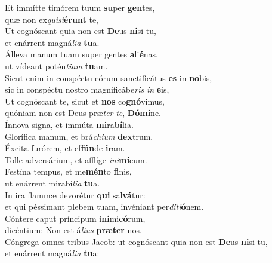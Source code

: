 \evenverse Et immítte timórem tuum \textbf{su}per \textbf{gen}tes,~\*\\
\evenverse quæ non ex\textit{qui}\textit{si}\textbf{é}\textbf{runt} te,\\
\oddverse Ut cognóscant quia non est \textbf{De}us \textbf{ni}si tu,~\*\\
\oddverse et enárrent magná\textit{li}\textit{a} \textbf{tu}a.\\
\evenverse Álleva manum tuam super gentes \textbf{a}li\textbf{é}nas,~\*\\
\evenverse ut vídeant potén\textit{ti}\textit{am} \textbf{tu}am.\\
\oddverse Sicut enim in conspéctu eórum sanctificátus \textbf{es} in \textbf{no}bis,~\*\\
\oddverse sic in conspéctu nostro magnificábe\textit{ris} \textit{in} \textbf{e}is,\\
\evenverse Ut cognóscant te, sicut et \textbf{nos} co\textbf{gnó}vimus,~\*\\
\evenverse quóniam non est Deus præ\textit{ter} \textit{te}, \textbf{Dó}\textbf{mi}ne.\\
\oddverse Ínnova signa, et immúta \textbf{mi}ra\textbf{bí}lia.~\*\\
\oddverse Glorífica manum, et brá\textit{chi}\textit{um} \textbf{dex}trum.\\
\evenverse Éxcita furórem, et ef\textbf{fún}de \textbf{i}ram.~\*\\
\evenverse Tolle adversárium, et afflíge \textit{i}\textit{ni}\textbf{mí}cum.\\
\oddverse Festína tempus, et me\textbf{mén}to \textbf{fi}nis,~\*\\
\oddverse ut enárrent mirabí\textit{li}\textit{a} \textbf{tu}a.\\
\evenverse In ira flammæ devorétur \textbf{qui} sal\textbf{vá}tur:~\*\\
\evenverse et qui péssimant plebem tuam, invéniant per\textit{di}\textit{ti}\textbf{ó}nem.\\
\oddverse Cóntere caput príncipum i\textbf{ni}mi\textbf{có}rum,~\*\\
\oddverse dicéntium: Non est á\textit{li}\textit{us} \textbf{præ}\textbf{ter} nos.\\
\evenverse Cóngrega omnes tribus Jacob: ut cognóscant quia non est \textbf{De}us \textbf{ni}si tu,~\*\\
\evenverse et enárrent magná\textit{li}\textit{a} \textbf{tu}a:\\
